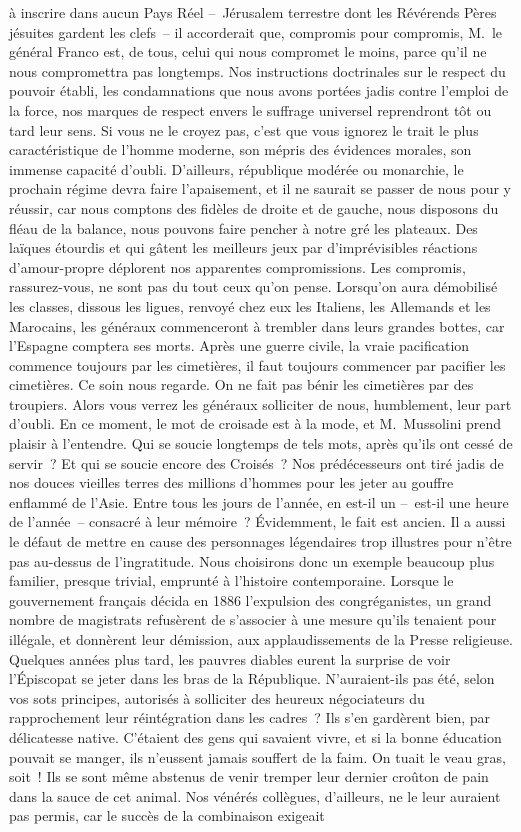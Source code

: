\documentclass[french,twoside]{book} %
\begin{document}
à inscrire dans aucun Pays Réel – Jérusalem terrestre dont les Révérends Pères jésuites gardent les clefs – il accorderait que, compromis pour compromis, M. le général Franco est, de tous, celui qui nous compromet le moins, parce qu’il ne nous compromettra pas longtemps. Nos instructions doctrinales sur le respect du pouvoir établi, les condamnations que nous avons portées jadis contre l’emploi de la force, nos marques de respect envers le suffrage universel reprendront tôt ou tard leur sens. Si vous ne le croyez pas, c’est que vous ignorez le trait le plus caractéristique de l’homme moderne, son mépris des évidences morales, son immense capacité d’oubli. D’ailleurs, république modérée ou monarchie, le prochain régime devra faire l’apaisement, et il ne saurait se passer de nous pour y réussir, car nous comptons des fidèles de droite et de gauche, nous disposons du fléau de la balance, nous pouvons faire pencher à notre gré les plateaux. Des laïques étourdis et qui gâtent les meilleurs jeux par d’imprévisibles réactions d’amour-propre déplorent nos apparentes compromissions. Les compromis, rassurez-vous, ne sont pas du tout ceux qu’on pense. Lorsqu’on aura démobilisé les classes, dissous les ligues, renvoyé chez eux les Italiens, les Allemands et les Marocains, les généraux commenceront à trembler dans leurs grandes bottes, car l’Espagne comptera ses morts. Après une guerre civile, la vraie pacification commence toujours par les cimetières, il faut toujours commencer par pacifier les cimetières. Ce soin nous regarde. On ne fait pas bénir les cimetières par des troupiers. Alors vous verrez les généraux solliciter de nous, humblement, leur part d’oubli. En ce moment, le mot de croisade est à la mode, et M. Mussolini prend plaisir à l’entendre. Qui se soucie longtemps de tels mots, après qu’ils ont cessé de servir ? Et qui se soucie encore des Croisés ? Nos prédécesseurs ont tiré jadis de nos douces vieilles terres des millions d’hommes pour les jeter au gouffre enflammé de l’Asie. Entre tous les jours de l’année, en est-il un – est-il une heure de l’année – consacré à leur mémoire ? Évidemment, le fait est ancien. Il a aussi le défaut de mettre en cause des personnages légendaires trop illustres pour n’être pas au-dessus de l’ingratitude. Nous choisirons donc un exemple beaucoup plus familier, presque trivial, emprunté à l’histoire contemporaine. Lorsque le gouvernement français décida en 1886 l’expulsion des congréganistes, un grand nombre de magistrats refusèrent de s’associer à une mesure qu’ils tenaient pour illégale, et donnèrent leur démission, aux applaudissements de la Presse religieuse. Quelques années plus tard, les pauvres diables eurent la surprise de voir l’Épiscopat se jeter dans les bras de la République. N’auraient-ils pas été, selon vos sots principes, autorisés à solliciter des heureux négociateurs du rapprochement leur réintégration dans les cadres ? Ils s’en gardèrent bien, par délicatesse native. C’étaient des gens qui savaient vivre, et si la bonne éducation pouvait se manger, ils n’eussent jamais souffert de la faim. On tuait le veau gras, soit ! Ils se sont même abstenus de venir tremper leur dernier croûton de pain dans la sauce de cet animal. Nos vénérés collègues, d’ailleurs, ne le leur auraient pas permis, car le succès de la combinaison exigeait 
\end{document}
